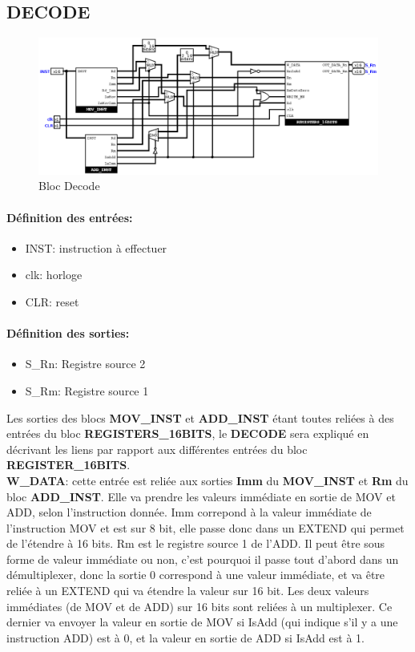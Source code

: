 \documentclass[a4paper]{article} %
\begin{document}
    
\subsection{DECODE}
\begin{figure}[H]
    \centering
    \includegraphics[width=1\textwidth]{src/Et4_DECODE.png}
    \caption{Bloc Decode}
    \label{decode_img}
\end{figure}

\paragraph{Définition des entrées:}
\begin{itemize}
    \item     INST: instruction à effectuer
    \item     clk: horloge
    \item     CLR: reset
\end{itemize}

\paragraph{Définition des sorties:}
\begin{itemize}
    \item     S\_Rn: Registre source 2
    \item     S\_Rm: Registre source 1
\end{itemize}
\medskip
Les sorties des blocs \textbf{MOV\_INST} et \textbf{ADD\_INST} étant toutes reliées à des entrées du bloc \textbf{REGISTERS\_16BITS}, le \textbf{DECODE} sera expliqué en décrivant les liens par rapport aux différentes entrées du bloc \textbf{REGISTER\_16BITS}. \medskip \\
\textbf{W\_DATA}: cette entrée est reliée aux sorties \textbf{Imm} du \textbf{MOV\_INST} et \textbf{Rm} du bloc \textbf{ADD\_INST}. Elle va prendre les valeurs immédiate en sortie de MOV et ADD, selon l'instruction donnée. Imm correpond à la valeur immédiate de l'instruction MOV et est sur 8 bit, elle passe donc dans un EXTEND qui permet de l'étendre à 16 bits. Rm est le registre source 1 de l'ADD. Il peut être sous forme de valeur immédiate ou non, c'est pourquoi il passe tout d'abord dans un démultiplexer, donc la sortie 0 correspond à une valeur immédiate, et va être reliée à un EXTEND qui va étendre la valeur sur 16 bit. Les deux valeurs immédiates (de MOV et de ADD) sur 16 bits sont reliées à un multiplexer. Ce dernier va envoyer la valeur en sortie de MOV si IsAdd (qui indique s'il y a une instruction ADD) est à 0, et la valeur en sortie de ADD si IsAdd est à 1.\\
\end{document}
